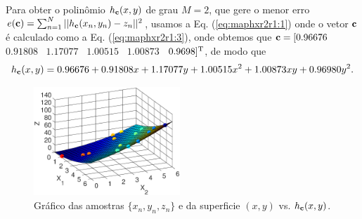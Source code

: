 \begin{SolutionT}\label{sol:theo:maphxr2r1}
Para obter o polinômio $h_{\VECTOR{c}}(x,y)$ de grau $M=2$, 
que gere o menor erro $e(\VECTOR{c}) =  \sum_{n=1}^{N} ||h_{\VECTOR{c}}(x_n,y_n)-z_n||^2$,
usamos a Eq. (\ref{eq:maphxr2r1:1}) onde o vetor $\VECTOR{c}$ é calculado como a Eq. (\ref{eq:maphxr2r1:3}),
onde obtemos que $\VECTOR{c}=[0.96676$~ $0.91808$~ $1.17077$~ $1.00515$~ $1.00873$~ $0.9698]^{\mathrm{T}}$, de modo que
\begin{equation}
h_{\VECTOR{c}}(x,y) =   0.96676 +0.91808 x +1.17077 y +1.00515 x^2 +1.00873 xy +0.96980 y^2.
\end{equation}
    \begin{figure}[!h]
        \centering
        \includegraphics[width=0.49\textwidth]{chapters/mapeamento/mfiles/mapeamentor2r1/minimizando_hx.eps}
        \caption{Gráfico das amostras $\{x_n,y_n,z_n\}$ e da superficie $(x,y)$ vs. $h_{\VECTOR{c}}(x,y)$.}
        \label{fig:theo:maphxr2r1:xnyn}
    \end{figure}

\end{SolutionT}


